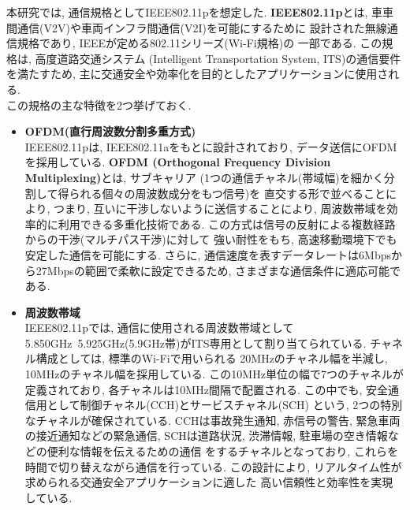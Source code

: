 \indent 本研究では, 通信規格としてIEEE802.11pを想定した. 
\textbf{IEEE802.11p}とは, 車車間通信(V2V)や車両インフラ間通信(V2I)を可能にするために
設計された無線通信規格であり, IEEEが定める802.11シリーズ(Wi-Fi規格)の
一部である. この規格は, 高度道路交通システム
(Intelligent Transportation System, ITS)の通信要件を満たすため, 
主に交通安全や効率化を目的としたアプリケーションに使用される.\\
\indent この規格の主な特徴を2つ挙げておく. 
\begin{itemize}
  \item \textbf{OFDM(直行周波数分割多重方式)}\\
  \indent IEEE802.11pは, IEEE802.11aをもとに設計されており, 
  データ送信にOFDMを採用している. 
  \textbf{OFDM (Orthogonal Frequency Division Multiplexing)}とは, サブキャリア
  (1つの通信チャネル(帯域幅)を細かく分割して得られる個々の周波数成分をもつ信号)を
  直交する形で並べることにより, つまり, 互いに干渉しないように送信することにより, 
  周波数帯域を効率的に利用できる多重化技術である. 
  この方式は信号の反射による複数経路からの干渉(マルチパス干渉)に対して
  強い耐性をもち, 高速移動環境下でも安定した通信を可能にする. さらに, 
  通信速度を表すデータレートは6Mbpsから27Mbpsの範囲で柔軟に設定できるため, 
  さまざまな通信条件に適応可能である. 
  \item \textbf{周波数帯域}\\
  \indent IEEE802.11pでは, 通信に使用される周波数帯域として
  5.850GHz~5.925GHz(5.9GHz帯)がITS専用として割り当てられている. 
  チャネル構成としては, 標準のWi-Fiで用いられる
  20MHzのチャネル幅を半減し, 10MHzのチャネル幅を採用している. 
  この10MHz単位の幅で7つのチャネルが定義されており, 
  各チャネルは10MHz間隔で配置される. 
  この中でも, 安全通信用として制御チャネル(CCH)とサービスチャネル(SCH)
  という, 2つの特別なチャネルが確保されている. 
  CCHは事故発生通知, 赤信号の警告, 緊急車両の接近通知などの緊急通信, 
  SCHは道路状況, 渋滞情報, 駐車場の空き情報などの便利な情報を伝えるための通信
  をするチャネルとなっており,  これらを時間で切り替えながら通信を行っている. 
  この設計により, リアルタイム性が求められる交通安全アプリケーションに適した
  高い信頼性と効率性を実現している. 
\end{itemize}
